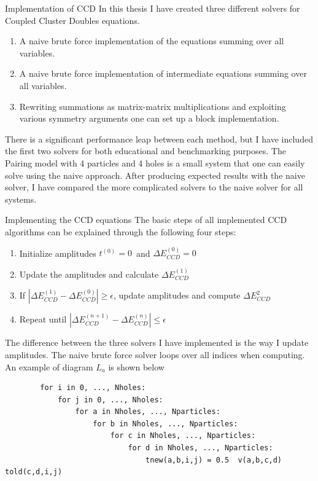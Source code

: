 \documentclass[twoside,english]{uiofysmaster}
\begin{document}
\begin{chapter}{Implementation of CCD}
	In this thesis I have created three different solvers for Coupled Cluster Doubles equations. 
	\begin{enumerate}
		\item A naive brute force implementation of the equations summing over all variables. 
		\item A naive brute force implementation of intermediate equations summing over all variables.
		\item Rewriting summations as matrix-matrix multiplications and exploiting various symmetry arguments one can set up a block implementation.
	\end{enumerate}	
	There is a significant performance leap between each method, but I have included the first two solvers for both educational and benchmarking purposes. The Pairing model with 4 particles and 4 holes is a small system that one can easily solve using the naive approach. After producing expected results with the naive solver, I have compared the more complicated solvers to the naive solver for all systems. 

	\begin{section}{Implementing the CCD equations}
		The basic steps of all implemented CCD algorithms can be explained through the following four steps:
		\begin{enumerate}
			\item Initialize amplitudes $t^{(0)} = 0$ and $\Delta E_{CCD}^{(0)} = 0$
			\item Update the amplitudes and calculate $\Delta E_{CCD}^{(1)}$
			\item If $ |\Delta E_{CCD}^{(1)} - \Delta E_{CCD}^{(0)}| \geq \epsilon $, update amplitudes and compute $\Delta E_{CCD}^{2}$
			\item Repeat until $ |\Delta E_{CCD}^{(n+1)} - \Delta E_{CCD}^{(n)}| \leq \epsilon $
		\end{enumerate}
		The difference between the three solvers I have implemented is the way I update amplitudes. The naive brute force solver loops over all indices when computing. An example of diagram $L_a$ is shown below

		\begin{lstlisting}
		for i in 0, ..., Nholes:
			for j in 0, ..., Nholes:
				for a in Nholes, ..., Nparticles:
					for b in Nholes, ..., Nparticles:
						for c in Nholes, ..., Nparticles:
							for d in Nholes, ..., Nparticles:
								tnew(a,b,i,j) = 0.5  v(a,b,c,d)  told(c,d,i,j)
		\end{lstlisting}


\end{section}
\end{chapter}
\end{document}
